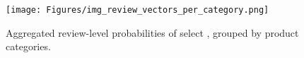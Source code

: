 \begin{figure}
  \centering
  \texttt{[image: Figures/img\_review\_vectors\_per\_category.png]}
  \caption{Aggregated review-level probabilities of select \taxtypes{}, grouped by product categories.}
  \label{fig_review_vectors_per_category}
\end{figure}